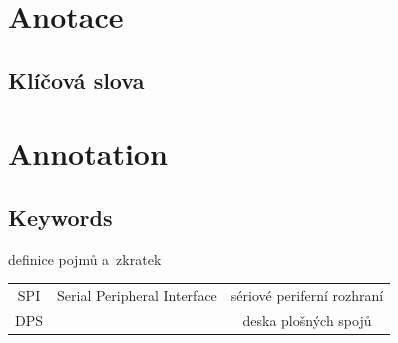 \documentclass{template/socthesis}
\author{Šimon Hrouda}
\begin{document}
\newcommand{\bardgen}[3]{following text generated by~ai~(google bard) on~#1\\%
  \begin{tcolorbox}[breakable, colback=blue!20]
    #2
  \end{tcolorbox}
  \begin{tcolorbox}[breakable, colback=blue!10, colframe=white]
    #3
  \end{tcolorbox}
}


\maketitle



\pagestyle{empty}

\section*{Anotace}


\subsection*{Klíčová slova}


\vspace{20mm}

\section*{Annotation}


\subsection*{Keywords}


\newpage
\pagestyle{plain}

\tableofcontents %

\setcounter{figure}{0}
\setcounter{table}{0}

\newpage

definice pojmů a~zkratek
\begin{center}
  \begin{tabular}{c c c}
    SPI  & Serial Peripheral Interface     & sériové periferní rozhraní            \\
    DPS & & deska plošných spojů \\
  \end{tabular}
\end{center}
\end{document}
